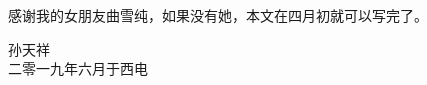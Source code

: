 
\begin{acknowledgments}

  感谢我的女朋友曲雪纯，如果没有她，本文在四月初就可以写完了。
  
  \begin{flushright}
  	孙天祥\\
  	二零一九年六月于西电
  \end{flushright}

\end{acknowledgments}

